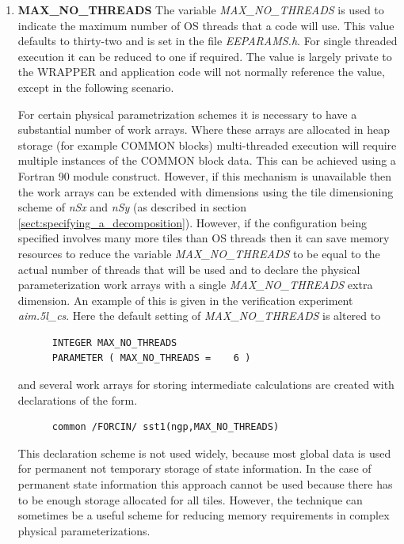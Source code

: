 \begin{enumerate}
\item {\bf MAX\_NO\_THREADS}
  The variable {\em MAX\_NO\_THREADS} is used to indicate the maximum
  number of OS threads that a code will use. This value defaults to
  thirty-two and is set in the file {\em EEPARAMS.h}.  For single
  threaded execution it can be reduced to one if required.  The value
  is largely private to the WRAPPER and application code will not
  normally reference the value, except in the following scenario.

  For certain physical parametrization schemes it is necessary to have
  a substantial number of work arrays. Where these arrays are
  allocated in heap storage (for example COMMON blocks) multi-threaded
  execution will require multiple instances of the COMMON block data.
  This can be achieved using a Fortran 90 module construct.  However,
  if this mechanism is unavailable then the work arrays can be extended
  with dimensions using the tile dimensioning scheme of {\em nSx} and
  {\em nSy} (as described in section
  \ref{sect:specifying_a_decomposition}). However, if the
  configuration being specified involves many more tiles than OS
  threads then it can save memory resources to reduce the variable
  {\em MAX\_NO\_THREADS} to be equal to the actual number of threads
  that will be used and to declare the physical parameterization work
  arrays with a single {\em MAX\_NO\_THREADS} extra dimension.  An
  example of this is given in the verification experiment {\em
    aim.5l\_cs}. Here the default setting of {\em MAX\_NO\_THREADS} is
  altered to
\begin{verbatim}
      INTEGER MAX_NO_THREADS
      PARAMETER ( MAX_NO_THREADS =    6 )
\end{verbatim}
  and several work arrays for storing intermediate calculations are
  created with declarations of the form.
\begin{verbatim}
      common /FORCIN/ sst1(ngp,MAX_NO_THREADS)
\end{verbatim}
  This declaration scheme is not used widely, because most global data
  is used for permanent not temporary storage of state information.
  In the case of permanent state information this approach cannot be
  used because there has to be enough storage allocated for all tiles.
  However, the technique can sometimes be a useful scheme for reducing
  memory requirements in complex physical parameterizations.
\end{enumerate}

